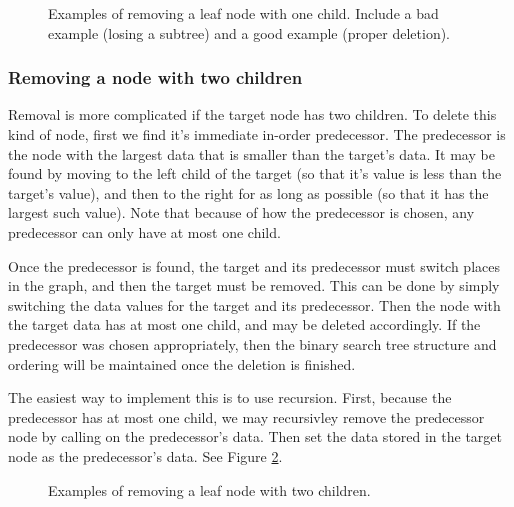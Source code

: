 \begin{figure}
\caption{Examples of removing a leaf node with one child. Include a bad example (losing a subtree) and a good example (proper deletion).}
\label{fig:BST.remove_oneChild}
\end{figure}

\subsubsection*{Removing a node with two children}

Removal is more complicated if the target node has two children.
To delete this kind of node, first we find it's immediate in-order predecessor.
The predecessor is the node with the largest data that is smaller than the target's data.
It may be found by moving to the left child of the target (so that it's value is less than the target's value), and then to the right for as long as possible (so that it has the largest such value).
Note that because of how the predecessor is chosen, any predecessor can only have at most one child.

Once the predecessor is found, the target and its predecessor must switch places in the graph, and then the target must be removed.
This can be done by simply switching the data values for the target and its predecessor.
Then the node with the target data has at most one child, and may be deleted accordingly.
If the predecessor was chosen appropriately, then the binary search tree structure and ordering will be maintained once the deletion is finished.

The easiest way to implement this is to use recursion.
First, because the predecessor has at most one child, we may recursivley remove the predecessor node by calling  on the predecessor's data.
Then set the data stored in the target node as the predecessor's data.
See Figure \ref{fig:BST.remove_twoChild}.

\begin{figure}
\caption{Examples of removing a leaf node with two children.}
\label{fig:BST.remove_twoChild}
\end{figure}

